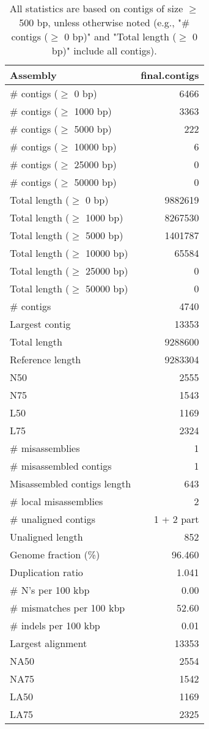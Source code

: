 \documentclass[12pt,a4paper]{article}
\begin{document}
\begin{table}[ht]
\begin{center}
\caption{All statistics are based on contigs of size $\geq$ 500 bp, unless otherwise noted (e.g., "\# contigs ($\geq$ 0 bp)" and "Total length ($\geq$ 0 bp)" include all contigs).}
\begin{tabular}{|l*{1}{|r}|}
\hline
Assembly & final.contigs \\ \hline
\# contigs ($\geq$ 0 bp) & 6466 \\ \hline
\# contigs ($\geq$ 1000 bp) & 3363 \\ \hline
\# contigs ($\geq$ 5000 bp) & 222 \\ \hline
\# contigs ($\geq$ 10000 bp) & 6 \\ \hline
\# contigs ($\geq$ 25000 bp) & 0 \\ \hline
\# contigs ($\geq$ 50000 bp) & 0 \\ \hline
Total length ($\geq$ 0 bp) & 9882619 \\ \hline
Total length ($\geq$ 1000 bp) & 8267530 \\ \hline
Total length ($\geq$ 5000 bp) & 1401787 \\ \hline
Total length ($\geq$ 10000 bp) & 65584 \\ \hline
Total length ($\geq$ 25000 bp) & 0 \\ \hline
Total length ($\geq$ 50000 bp) & 0 \\ \hline
\# contigs & 4740 \\ \hline
Largest contig & 13353 \\ \hline
Total length & 9288600 \\ \hline
Reference length & 9283304 \\ \hline
N50 & 2555 \\ \hline
N75 & 1543 \\ \hline
L50 & 1169 \\ \hline
L75 & 2324 \\ \hline
\# misassemblies & 1 \\ \hline
\# misassembled contigs & 1 \\ \hline
Misassembled contigs length & 643 \\ \hline
\# local misassemblies & 2 \\ \hline
\# unaligned contigs & 1 + 2 part \\ \hline
Unaligned length & 852 \\ \hline
Genome fraction (\%) & 96.460 \\ \hline
Duplication ratio & 1.041 \\ \hline
\# N's per 100 kbp & 0.00 \\ \hline
\# mismatches per 100 kbp & 52.60 \\ \hline
\# indels per 100 kbp & 0.01 \\ \hline
Largest alignment & 13353 \\ \hline
NA50 & 2554 \\ \hline
NA75 & 1542 \\ \hline
LA50 & 1169 \\ \hline
LA75 & 2325 \\ \hline
\end{tabular}
\end{center}
\end{table}
\end{document}
